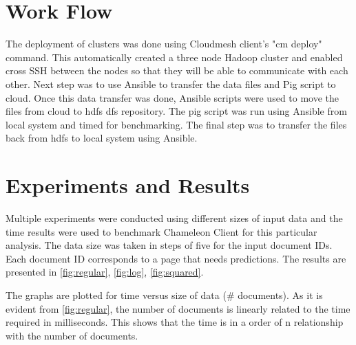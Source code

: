 \documentclass[9pt,twocolumn,twoside]{../../styles/osajnl}
\begin{document}
\section{Work Flow}

The deployment of clusters was done using Cloudmesh client's "cm deploy" command. This automatically created a three node Hadoop cluster and enabled cross SSH between the nodes so that they will be able to communicate with each other. Next step was to use Ansible to transfer the data files and Pig script to cloud. Once this data transfer was done, Ansible scripts were used to move the files from cloud to hdfs dfs repository. The pig script was run using Ansible from local system and timed for benchmarking. The final step was to transfer the files back from hdfs to local system using Ansible.

\section{Experiments and Results}
Multiple experiments were conducted using different sizes of input data and the time results were used to benchmark Chameleon Client for this particular analysis. The data size was taken in steps of five for the input document IDs. Each document ID corresponds to a page that needs predictions. The results are presented in  \ref{fig:regular}, \ref{fig:log}, \ref{fig:squared}.  

The graphs are plotted for time versus size of data (\# documents). As it is evident from \ref{fig:regular}, the number of documents is linearly related to the time required in milliseconds. This shows that the time is in a order of n relationship with the number of documents.
\end{document}
